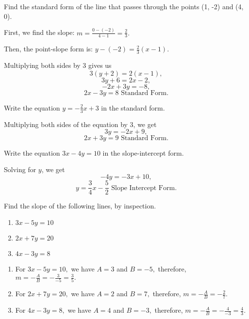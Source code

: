 \begin{example}
Find the standard form of the line that passes through the points (1, -2) and (4, 0).
\end{example}

\begin{solution}
First, we find the slope: $m = \frac{0 - (-2)}{4 - 1} = \frac{2}{3}.$

Then, the point-slope form is: $y - (-2) = \frac{2}{3}(x - 1).$

Multiplying both sides by 3 gives us
\[3(y + 2) = 2(x - 1),\]
\[3y + 6 = 2x - 2,\]
\[-2x + 3y = -8,\]
\[2x - 3y = 8 \text{ Standard Form}.\]
\end{solution}


\begin{example}
Write the equation $y = -\frac{2}{3}x + 3$ in the standard form.
\end{example}

\begin{solution}
Multiplying both sides of the equation by 3, we get
\[3y = -2x + 9,\]
\[2x + 3y = 9 \text{ Standard Form}.\]
\end{solution}


\begin{example}
Write the equation $3x - 4y = 10$ in the slope-intercept form.
\end{example}

\begin{solution}
Solving for $y$, we get
\[-4y = -3x + 10,\]
\[y = \frac{3}{4}x - \frac{5}{2} \text{ Slope Intercept Form}.\]
\end{solution}

\begin{example}
Find the slope of the following lines, by inspection.
\begin{enumerate}
    \item $3x - 5y = 10$
    \item $2x + 7y = 20$
    \item $4x - 3y = 8$
\end{enumerate}
\end{example}

\begin{solution}
\begin{enumerate}
    \item For $3x - 5y = 10,$ we have $A = 3$ and $B = -5,$ therefore, $m = -\frac{A}{B} = -\frac{3}{-5} = \frac{3}{5}.$
    
    \item For $2x + 7y = 20,$ we have $A = 2$ and $B = 7,$ therefore, $m = -\frac{A}{B} = -\frac{2}{7}.$
    
    \item For $4x - 3y = 8,$ we have $A = 4$ and $B = -3,$ therefore, $m = -\frac{A}{B} = -\frac{4}{-3} = \frac{4}{3}.$
\end{enumerate}
\end{solution}


